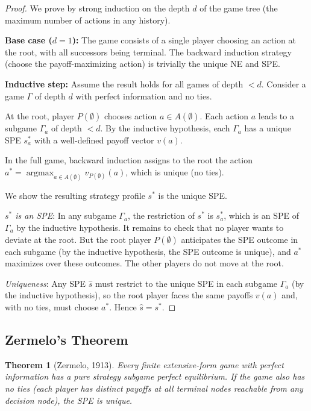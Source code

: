 \documentclass[11pt,a4paper]{article}
\theoremstyle{definition}
\theoremstyle{plain}
\newtheorem{theorem}{Theorem}[section]
\theoremstyle{remark}
\DeclareMathOperator{\argmax}{argmax}
\begin{document}
\begin{proof}
We prove by strong induction on the depth $d$ of the game tree (the maximum number of
actions in any history).

\textbf{Base case ($d = 1$):} The game consists of a single player choosing an action
at the root, with all successors being terminal. The backward induction strategy
(choose the payoff-maximizing action) is trivially the unique NE and SPE.

\textbf{Inductive step:} Assume the result holds for all games of depth $< d$.
Consider a game $\Gamma$ of depth $d$ with perfect information and no ties.

At the root, player $P(\emptyset)$ chooses action $a \in A(\emptyset)$. Each action $a$
leads to a subgame $\Gamma_a$ of depth $< d$. By the inductive hypothesis, each
$\Gamma_a$ has a unique SPE $s^*_a$ with a well-defined payoff vector $v(a)$.

In the full game, backward induction assigns to the root the action
$a^* = \argmax_{a \in A(\emptyset)} v_{P(\emptyset)}(a)$, which is unique (no ties).

We show the resulting strategy profile $s^*$ is the unique SPE.

\emph{$s^*$ is an SPE}: In any subgame $\Gamma_a$, the restriction of $s^*$ is $s^*_a$,
which is an SPE of $\Gamma_a$ by the inductive hypothesis. It remains to check that no
player wants to deviate at the root. But the root player $P(\emptyset)$ anticipates the
SPE outcome in each subgame (by the inductive hypothesis, the SPE outcome is unique),
and $a^*$ maximizes over these outcomes. The other players do not move at the root.

\emph{Uniqueness}: Any SPE $\hat{s}$ must restrict to the unique SPE in each subgame
$\Gamma_a$ (by the inductive hypothesis), so the root player faces the same payoffs
$v(a)$ and, with no ties, must choose $a^*$. Hence $\hat{s} = s^*$.
\end{proof}

\subsection{Zermelo's Theorem}
\label{subsec:zermelo}

\begin{keyresult}
\begin{theorem}[Zermelo, 1913]
\label{thm:zermelo}
Every finite extensive-form game with perfect information has a pure strategy subgame
perfect equilibrium. If the game also has no ties (each player has distinct payoffs at
all terminal nodes reachable from any decision node), the SPE is unique.
\end{theorem}
\end{keyresult}
\end{document}

